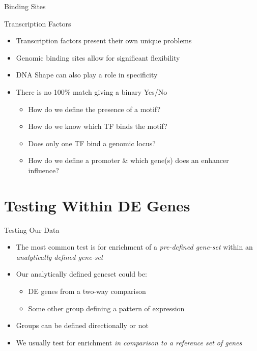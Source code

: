 \documentclass[aspectratio=169,11pt]{beamer}
\begin{document}
\begin{frame}{Binding Sites}
\begin{figure}
\label{fig:test}
\end{figure}

\end{frame}

\begin{frame}{Transcription Factors}

	\begin{itemize}
		\item Transcription factors present their own unique problems
		\item Genomic binding sites allow for significant flexibility
		\item DNA Shape can also play a role in specificity
		\item There is no 100\% match giving a binary Yes/No
		\pause
		\begin{itemize}
			\item How do we define the presence of a motif?
			\item How do we know which TF binds the motif?
			\item Does only one TF bind a genomic locus?
			\item How do we define a promoter \& which gene(s) does an enhancer influence?
		\end{itemize}
	\end{itemize}

\end{frame}

\section{Testing Within DE Genes}

\begin{frame}{Testing Our Data}

	\begin{itemize}
		\item The most common test is for enrichment of a \textit{pre-defined gene-set} within an \textit{analytically defined gene-set}
		\item Our analytically defined geneset could be:
		\begin{itemize}
			\item DE genes from a two-way comparison
			\item Some other group defining a pattern of expression
		\end{itemize}		
		\item Groups can be defined directionally or not
		\item We usually test for enrichment \textit{in comparison to a reference set of genes}
	\end{itemize}

\end{frame}
\end{document}
